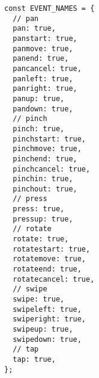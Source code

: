 \begin{verbatim}
const EVENT_NAMES = {
  // pan
  pan: true,
  panstart: true,
  panmove: true,
  panend: true,
  pancancel: true,
  panleft: true,
  panright: true,
  panup: true,
  pandown: true,
  // pinch
  pinch: true,
  pinchstart: true,
  pinchmove: true,
  pinchend: true,
  pinchcancel: true,
  pinchin: true,
  pinchout: true,
  // press
  press: true,
  pressup: true,
  // rotate
  rotate: true,
  rotatestart: true,
  rotatemove: true,
  rotateend: true,
  rotatecancel: true,
  // swipe
  swipe: true,
  swipeleft: true,
  swiperight: true,
  swipeup: true,
  swipedown: true,
  // tap
  tap: true,
};
\end{verbatim}
